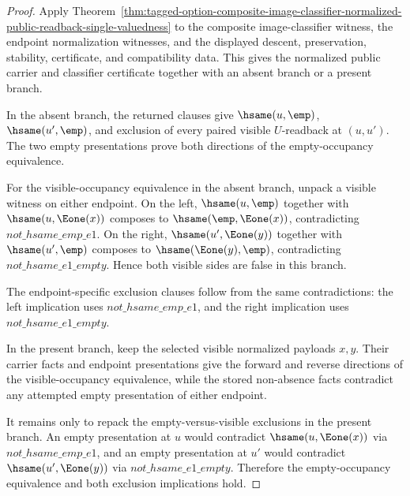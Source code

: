 \begin{proof}
Apply
Theorem~\ref{thm:tagged-option-composite-image-classifier-normalized-public-readback-single-valuedness}
to the composite image-classifier witness, the endpoint normalization witnesses,
and the displayed descent, preservation, stability, certificate, and
compatibility data. This gives the normalized public carrier and classifier
certificate together with an absent branch or a present branch.

In the absent branch, the returned clauses give $\hsame(u,\emp)$,
$\hsame(u',\emp)$, and exclusion of every paired visible $U$-readback at
$(u,u')$. The two empty presentations prove both directions of the
empty-occupancy equivalence.

For the visible-occupancy equivalence in the absent branch, unpack a visible
witness on either endpoint. On the left, $\hsame(u,\emp)$ together with
$\hsame(u,\Eone(x))$ composes to $\hsame(\emp,\Eone(x))$, contradicting
$not\_hsame\_emp\_e1$. On the right, $\hsame(u',\Eone(y))$ together with
$\hsame(u',\emp)$ composes to $\hsame(\Eone(y),\emp)$, contradicting
$not\_hsame\_e1\_empty$. Hence both visible sides are false in this branch.

The endpoint-specific exclusion clauses follow from the same contradictions:
the left implication uses $not\_hsame\_emp\_e1$, and the right implication uses
$not\_hsame\_e1\_empty$.

In the present branch, keep the selected visible normalized payloads $x,y$.
Their carrier facts and endpoint presentations give the forward and reverse
directions of the visible-occupancy equivalence, while the stored non-absence
facts contradict any attempted empty presentation of either endpoint.

It remains only to repack the empty-versus-visible exclusions in the present
branch. An empty presentation at $u$ would contradict
$\hsame(u,\Eone(x))$ via $not\_hsame\_emp\_e1$, and an empty presentation at
$u'$ would contradict $\hsame(u',\Eone(y))$ via $not\_hsame\_e1\_empty$.
Therefore the empty-occupancy equivalence and both exclusion implications hold.
\end{proof}

